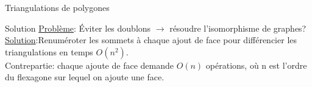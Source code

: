 \documentclass[french,xcolor=dvipsnames]{beamer}
\begin{document}
\begin{frame}{Triangulations de polygones}
\begin{figure}
			\end{figure}
		\end{frame}

		\begin{frame}{Solution}
			\underline{Problème}: Éviter les doublons \small{$\rightarrow$} résoudre l'isomorphisme de graphes?\\

			\underline{Solution}:Renuméroter les sommets à chaque ajout de face pour différencier les triangulations en temps $O(n^{2})$.\\
			Contrepartie: chaque ajoute de face demande $O(n)$ opérations, où n est l'ordre du flexagone sur lequel on ajoute une face.
		\end{frame}
\end{document}

